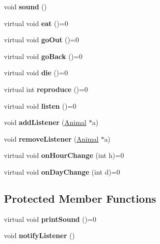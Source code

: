 \begin{DoxyCompactItemize}
void {\bfseries sound} ()
\item 
\mbox{\label{class_animal_ad018a3798fe7ddf30da60d8f2557701b}} 
virtual void {\bfseries eat} ()=0
\item 
\mbox{\label{class_animal_afcacae4af51b4f3fc88a1354f21dc7a7}} 
virtual void {\bfseries go\+Out} ()=0
\item 
\mbox{\label{class_animal_af74e43a1338419fe4582e61e2b4d8d34}} 
virtual void {\bfseries go\+Back} ()=0
\item 
\mbox{\label{class_animal_a6cc3df8555c60352f9c55ca174a9f9df}} 
virtual void {\bfseries die} ()=0
\item 
\mbox{\label{class_animal_aaa82a4b9ceb712c473d84b87c920043f}} 
virtual int {\bfseries reproduce} ()=0
\item 
\mbox{\label{class_animal_a126acfdd961c2d49373159b256d71b23}} 
virtual void {\bfseries listen} ()=0
\item 
\mbox{\label{class_animal_ae3e210967f50cee3ef1023d985976867}} 
void {\bfseries add\+Listener} (\hyperlink{class_animal}{Animal} $\ast$a)
\item 
\mbox{\label{class_animal_a83e0c4009f62540aca99f0b5ceeb7fdd}} 
void {\bfseries remove\+Listener} (\hyperlink{class_animal}{Animal} $\ast$a)
\item 
\mbox{\label{class_animal_aec682deda01c7165197f7c7eba9ab88c}} 
virtual void {\bfseries on\+Hour\+Change} (int h)=0
\item 
\mbox{\label{class_animal_af4b1639570a362dda44948ed483bf94c}} 
virtual void {\bfseries on\+Day\+Change} (int d)=0
\end{DoxyCompactItemize}
\subsection*{Protected Member Functions}
\begin{DoxyCompactItemize}
\item 
\mbox{\label{class_animal_a93ad63b6239f8f18d167034b7948f35a}} 
virtual void {\bfseries print\+Sound} ()=0
\item 
\mbox{\label{class_animal_aa1ebce4b14be5e3d38c831b51a7ac307}} 
void {\bfseries notify\+Listener} ()
\end{DoxyCompactItemize}
